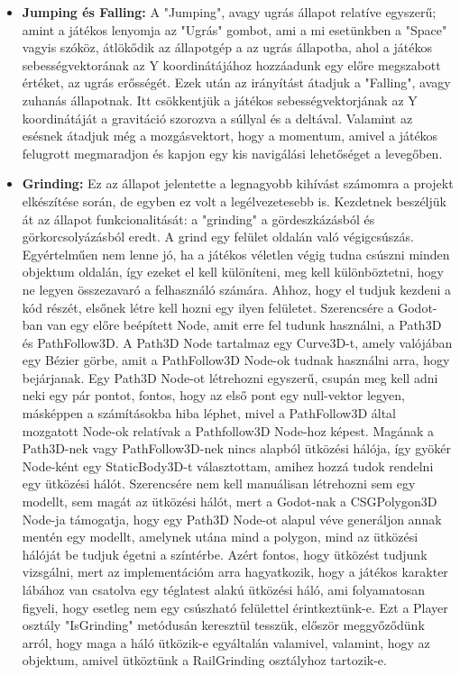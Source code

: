 \begin{itemize}
	\item \textbf{Jumping és Falling:} A "Jumping", avagy ugrás állapot relatíve egyszerű; amint a játékos lenyomja az "Ugrás" gombot, ami a mi esetünkben a "Space" vagyis szóköz, átlökődik az állapotgép a az ugrás állapotba, ahol a játékos sebességvektorának az Y koordinátájához hozzáadunk egy előre megszabott értéket, az ugrás erősségét. Ezek után az irányítást átadjuk a "Falling", avagy zuhanás állapotnak. Itt csökkentjük a játékos sebességvektorjának az Y koordinátáját a gravitáció szorozva a súllyal és a deltával. Valamint az esésnek átadjuk még a mozgásvektort, hogy a momentum, amivel a játékos felugrott megmaradjon és kapjon egy kis navigálási lehetőséget a levegőben.
	\item \textbf{Grinding:} Ez az állapot jelentette a legnagyobb kihívást számomra a projekt elkészítése során, de egyben ez volt a legélvezetesebb is. Kezdetnek beszéljük át az állapot funkcionalitását: a "grinding" a gördeszkázásból és görkorcsolyázásból eredt. A grind egy felület oldalán való végigcsúszás. Egyértelműen nem lenne jó, ha a játékos véletlen végig tudna csúszni minden objektum oldalán, így ezeket el kell különíte\-ni, meg kell különböztetni, hogy ne legyen összezavaró a felhasználó számára. Ahhoz, hogy el tudjuk kezdeni a kód részét, elsőnek létre kell hozni egy ilyen felületet. Szerencsére a Godot-ban van egy előre beépített Node, amit erre fel tudunk használni, a Path3D és PathFollow3D. A Path3D Node tartalmaz egy Curve3D-t, amely valójában egy Bézier görbe, amit a PathFollow3D Node-ok tudnak használni arra, hogy bejárjanak. Egy Path3D Node-ot létrehozni egyszerű, csupán meg kell adni neki egy pár pontot, fontos, hogy az első pont egy null-vektor legyen, másképpen a számításokba hiba léphet, mivel a PathFollow3D által mozgatott Node-ok relatívak a Pathfollow3D Node-hoz képest. Magának a Path3D-nek vagy PathFollow3D-nek nincs alapból ütközési hálója, így gyökér Node-ként egy StaticBody3D-t választottam, amihez hozzá tudok rendelni egy ütközési hálót. Szerencsére nem kell manuálisan létrehozni sem egy modellt, sem magát az ütközési hálót, mert a Godot-nak a CSGPolygon3D Node-ja támogatja, hogy egy Path3D Node-ot alapul véve generáljon annak mentén egy modellt, amelynek utána mind a polygon, mind az ütközési hálóját be tudjuk égetni a színtérbe. Azért fontos, hogy ütközést tudjunk vizsgálni, mert az implementációm arra hagyatkozik, hogy a játékos karakter lábához van csatolva egy téglatest alakú ütközési háló, ami folyamatosan figyeli, hogy esetleg nem egy csúszható felülettel érintkeztünk-e. Ezt a Player osztály "IsGrinding" metódusán keresztül tesszük, először meggyőződünk arról, hogy maga a háló ütközik-e egyáltalán valamivel, valamint, hogy az objektum, ami\-vel ütköztünk a RailGrinding osztályhoz tartozik-e.

\end{itemize}
